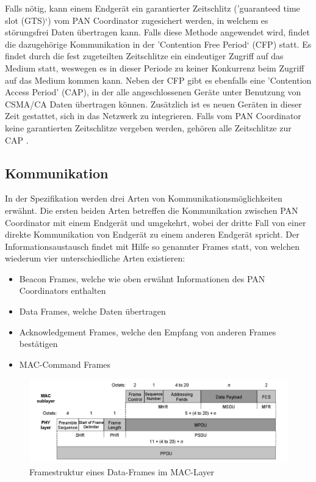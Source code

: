 Falls nötig, kann einem Endgerät ein garantierter Zeitschlitz ('guaranteed time slot (GTS)‘) vom PAN Coordinator zugesichert werden, in welchem es störungsfrei Daten übertragen kann. Falls diese Methode angewendet wird, findet die dazugehörige Kommunikation in der 'Contention Free Period‘ (CFP) statt. Es findet durch die fest zugeteilten Zeitschlitze ein eindeutiger Zugriff auf das Medium statt, weswegen es in dieser Periode zu keiner Konkurrenz beim Zugriff auf das Medium kommen kann. Neben der CFP gibt es ebenfalls eine 'Contention Access Period’ (CAP), in der alle angeschlossenen Geräte unter Benutzung von CSMA/CA Daten übertragen können. Zusätzlich ist es neuen Geräten in dieser Zeit gestattet, sich in das Netzwerk zu integrieren. Falls vom PAN Coordinator keine garantierten Zeitschlitze vergeben werden, gehören alle Zeitschlitze zur CAP \cite{d:hesse} \cite{d:ieee}.

\subsection{Kommunikation}\label{ss:Kommunikation}

In der Spezifikation werden drei Arten von Kommunikationsmöglichkeiten erwähnt. Die ersten beiden Arten betreffen die Kommunikation zwischen PAN Coordinator mit einem Endgerät und umgekehrt, wobei der dritte Fall von einer direkte Kommunikation von Endgerät zu einem anderen Endgerät spricht. Der Informationsaustausch findet mit Hilfe so genannter Frames statt, von welchen wiederum vier unterschiedliche Arten existieren:

\begin{itemize}
\item Beacon Frames, welche wie oben erwähnt Informationen des PAN Coordinators enthalten
\item Data Frames, welche Daten übertragen
\item Acknowledgement Frames, welche den Empfang von anderen Frames bestätigen
\item MAC-Command Frames
\end{itemize}

\begin{figure}[H] 
	\centering
	\includegraphics[scale=0.5]{Bilder/frameieee}
	\caption{Framestruktur eines Data-Frames im MAC-Layer\cite{d:ieee}}
	\label{f:frameieee}
\end{figure}

